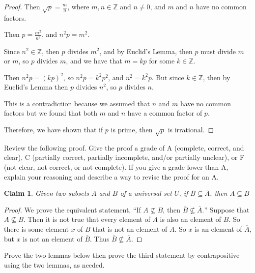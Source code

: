 \documentclass[12 pt]{exam}
\newtheorem{claim}{Claim}
\begin{document}
\begin{questions}
\begin{solution}
\begin{proof}
    Then $\sqrt{p} = \frac{m}{n}$, where $m,n \in \mathbb{Z}$ and $n \ne 0$, and $m$ and $n$
    have no common factors.

    Then $p = \frac{m^2}{n^2}$, and $n^2 p = m^2$.

    Since $n^2 \in \mathbb{Z}$, then $p$ divides $m^2$, and by Euclid's Lemma, then $p$
    must divide $m$ or $m$, so $p$ divides $m$, and we have that $m = kp$ for some $k \in \mathbb{Z}$.

    Then $n^2 p = (kp)^2$, so $n^2 p = k^2 p^2$, and $n^2 = k^2 p$. But since $k \in \mathbb{Z}$,
    then by Euclid's Lemma then $p$ divides $n^2$, so $p$ divides $n$.

    This is a contradiction because we assumed that $n$ and $m$ have no common factors
    but we found that both $m$ and $n$ have a common factor of $p$.

    Therefore, we have shown that if $p$ is prime, then $\sqrt{p}$ is irrational.
\end{proof}
\end{solution}


\question Review the following proof. Give the proof a grade of A (complete, correct, and clear), C (partially correct, partially incomplete, and/or partially unclear), or F (not clear, not correct, or not complete). If you give a grade lower than A, explain your reasoning and describe a way to revise the proof for an A.

    \begin{claim}
        Given two subsets $A$ and $B$ of a universal set $U$, if $\overline{B} \subseteq \overline{A}$, then $A \subseteq B$
    \end{claim}
    \begin{proof}
        We prove the equivalent statement, ``If $A \nsubseteq B$, then $\overline{B} \nsubseteq \overline{A}.$'' Suppose that $A \nsubseteq B$. Then it is not true that every element of $A$ is also an element of $B$. So there is some element $x$ of $B$ that is not an element of $A$. So $x$ is an element of $\overline{A}$, but $x$ is not an element of $\overline{B}$. Thus $\overline{B} \nsubseteq \overline{A}.$ 
    \end{proof}

\question Prove the two lemmas below then prove the third statement by contrapositive using the two lemmas, as needed. 
\end{questions}
\end{document}
